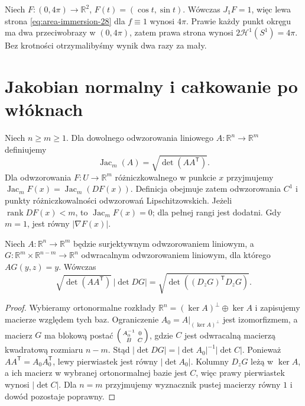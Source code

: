 \begin{przyklad}
Niech $F:(0,4\pi)\to\mathbb R^2$,
$F(t)=(\cos t,\sin t)$. Wówczas $J_1F=1$,
więc lewa strona \eqref{eq:area-immersion-28}
dla $f\equiv1$ wynosi $4\pi$.
Prawie każdy punkt okręgu ma dwa przeciwobrazy
w $(0,4\pi)$, zatem prawa strona wynosi
$2\mathcal H^1(S^1)=4\pi$.
Bez krotności otrzymalibyśmy wynik dwa razy za mały.
\end{przyklad}

\section{Jakobian normalny i całkowanie po włóknach}
\begin{definicja}
\label{def:normal-jacobian-28}
Niech $n\ge m\ge1$. Dla dowolnego odwzorowania
liniowego $A:\mathbb R^n\to\mathbb R^m$ definiujemy
\[
 \operatorname{Jac}_m(A)=\sqrt{\det(AA^{\mathsf T})}.
\]
Dla odwzorowania $F:U\to\mathbb R^m$ różniczkowalnego
w punkcie $x$ przyjmujemy
$\operatorname{Jac}_mF(x)=\operatorname{Jac}_m(DF(x))$.
Definicja obejmuje zatem odwzorowania $C^1$ i punkty
różniczkowalności odwzorowań Lipschitzowskich.
Jeżeli $\operatorname{rank}DF(x)<m$, to
$\operatorname{Jac}_mF(x)=0$; dla pełnej rangi
jest dodatni. Gdy $m=1$, jest równy $|\nabla F(x)|$.
\end{definicja}

\begin{lemat}
\label{lem:linear-coarea-28}
Niech $A:\mathbb R^n\to\mathbb R^m$ będzie
surjektywnym odwzorowaniem liniowym, a
$G:\mathbb R^m\times\mathbb R^{n-m}\to\mathbb R^n$
odwracalnym odwzorowaniem liniowym, dla którego
$AG(y,z)=y$. Wówczas
\[
 \sqrt{\det(AA^{\mathsf T})}\,|\det DG|
 =\sqrt{\det((D_zG)^{\mathsf T}D_zG)}.
\]
\end{lemat}
\begin{proof}
Wybieramy ortonormalne rozkłady
$\mathbb R^n=(\ker A)^\perp\oplus\ker A$
i zapisujemy macierze względem tych baz.
Ograniczenie $A_0=A|_{(\ker A)^\perp}$
jest izomorfizmem, a macierz $G$ ma blokową postać
$\begin{psmallmatrix} A_0^{-1}&0\\B&C\end{psmallmatrix}$,
gdzie $C$ jest odwracalną macierzą kwadratową
rozmiaru $n-m$. Stąd
$|\det DG|=|\det A_0|^{-1}|\det C|$.
Ponieważ $AA^{\mathsf T}=A_0A_0^{\mathsf T}$,
lewy pierwiastek jest równy $|\det A_0|$.
Kolumny $D_zG$ leżą w $\ker A$, a ich macierz
w wybranej ortonormalnej bazie jest $C$,
więc prawy pierwiastek wynosi $|\det C|$.
Dla $n=m$ przyjmujemy wyznacznik pustej
macierzy równy $1$ i dowód pozostaje poprawny.
\end{proof}

